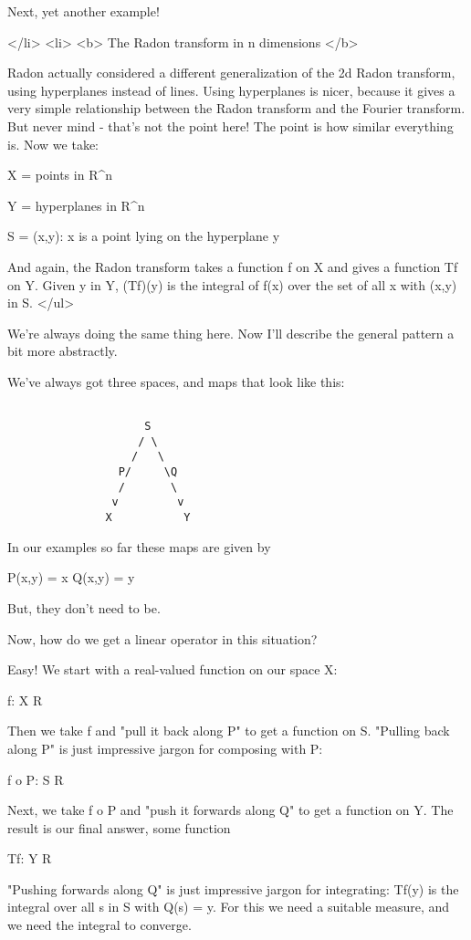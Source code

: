 Next, yet another example!

</li>
<li>
<b>
The Radon transform in n dimensions
</b>

Radon actually considered a different generalization of the
2d Radon transform, using hyperplanes instead of lines.  Using 
hyperplanes is nicer, because it gives a very simple relationship
between the Radon transform and the Fourier transform.  But never 
mind - that's not the point here!  The point is how similar
everything is.  Now we take:

X = {points in R^{n}}

Y = {hyperplanes in R^{n}}

S = {(x,y): x is a point lying on the hyperplane y}

And again, the Radon transform takes a function f on X 
and gives a function Tf on Y.  Given y in Y, (Tf)(y) is the 
integral of f(x) over the set of all x with (x,y) in S.
</ul>

We're always doing the same thing here.  Now I'll describe 
the general pattern a bit more abstractly.

We've always got three spaces, and maps that look like this:


\begin{verbatim}

                     S
                    / \
                   /   \
                 P/     \Q
                 /       \
                v         v 
               X           Y
\end{verbatim}
    
In our examples so far these maps are given by

P(x,y) = x
Q(x,y) = y

But, they don't need to be.

Now, how do we get a linear operator in this situation?  

Easy!  We start with a real-valued function on our space X:

f: X \to  R

Then we take f and "pull it back along P" to get a function on S.  
"Pulling back along P" is just impressive jargon for composing 
with P:

f o P: S \to  R

Next, we take f o P and "push it forwards along Q" to get a 
function on Y.  The result is our final answer, some function

Tf: Y \to  R

"Pushing forwards along Q" is just impressive jargon for 
integrating: Tf(y) is the integral over all s in S with Q(s) = y.
For this we need a suitable measure, and we need the integral
to converge.

